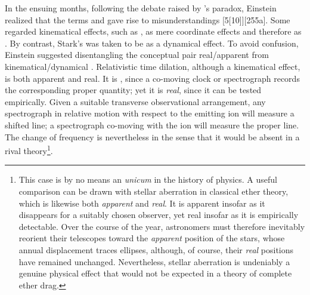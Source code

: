 \documentclass[pdflatex]{sn-jnl}
\begin{document}
In the ensuing months, following the debate raised by \Ehr’s paradox, Einstein realized that the terms  and  gave rise to misunderstandings [5{[}10{]}][255a]. Some regarded kinematical effects, such as , as mere coordinate effects and therefore as . By contrast, Stark’s  was taken to be  as a dynamical effect. To avoid confusion, Einstein suggested disentangling the conceptual pair real/apparent from kinematical/dynamical \citep{Einstein1911d}. Relativistic time dilation, although a kinematical effect, is both apparent and real. It is , since a co-moving clock or spectrograph records the corresponding proper quantity; yet it is \emph{real}, since it can be tested empirically. Given a suitable transverse observational arrangement, any spectrograph in relative motion with respect to the emitting ion will measure a shifted line; a spectrograph co-moving with the ion will measure the proper line. The  change of frequency is nevertheless  in the sense that it would be absent in a rival theory\footnote{This case is by no means an \emph{unicum} in the history of physics. A useful comparison can be drawn with stellar aberration in classical ether theory, which is likewise both \emph{apparent} and \emph{real}. It is apparent insofar as it disappears for a suitably chosen observer, yet real insofar as it is empirically detectable. Over the course of the year, astronomers must therefore inevitably reorient their telescopes toward the \emph{apparent} position of the stars, whose annual displacement traces ellipses, although, of course, their \emph{real} positions have remained unchanged. Nevertheless, stellar aberration is undeniably a genuine physical effect that would not be expected in a theory of complete ether drag. }. %
\end{document}
